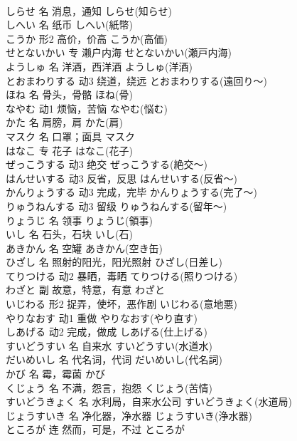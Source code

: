 \documentclass[8pt]{extreport}
\begin{document}
\begin{CJK}{UTF8}{min}
\\	しらせ	名	消息，通知	しらせ(知らせ)	
\\	しへい	名	纸币	しへい(紙幣)	
\\	こうか	形2	高价，价高	こうか(高価)	
\\	せとないかい	专	濑户内海	せとないかい(瀬戸内海)	
\\	ようしゅ	名	洋酒，西洋酒	ようしゅ(洋酒)	
\\	とおまわりする	动3	绕道，绕远	とおまわりする(遠回り～)	
\\	ほね	名	骨头，骨骼	ほね(骨)	
\\	なやむ	动1	烦恼，苦恼	なやむ(悩む)	
\\	かた	名	肩膀，肩	かた(肩)	
\\	マスク	名	口罩；面具	マスク	
\\	はなこ	专	花子	はなこ(花子)	
\\	ぜっこうする	动3	绝交	ぜっこうする(絶交～)	
\\	はんせいする	动3	反省，反思	はんせいする(反省～)	
\\	かんりょうする	动3	完成，完毕	かんりょうする(完了～)	
\\	りゅうねんする	动3	留级	りゅうねんする(留年～)	
\\	りょうじ	名	领事	りょうじ(領事)	
\\	いし	名	石头，石块	いし(石)	
\\	あきかん	名	空罐	あきかん(空き缶)	
\\	ひざし	名	照射的阳光，阳光照射	ひざし(日差し)	
\\	てりつける	动2	暴晒，毒晒	てりつける(照りつける)	
\\	わざと	副	故意，特意，有意	わざと	
\\	いじわる	形2	捉弄，使坏，恶作剧	いじわる(意地悪)	
\\	やりなおす	动1	重做	やりなおす(やり直す)	
\\	しあげる	动2	完成，做成	しあげる(仕上げる)	
\\	すいどうすい	名	自来水	すいどうすい(水道水)	
\\	だいめいし	名	代名词，代词	だいめいし(代名詞)	
\\	かび	名	霉，霉菌	かび	
\\	くじょう	名	不满，怨言，抱怨	くじょう(苦情)	
\\	すいどうきょく	名	水利局，自来水公司	すいどうきょく(水道局)	
\\	じょうすいき	名	净化器，净水器	じょうすいき(浄水器)	
\\	ところが	连	然而，可是，不过	ところが	

\end{CJK}
\end{document}
